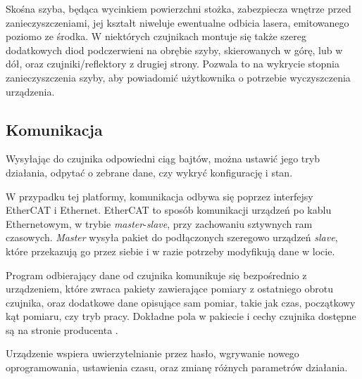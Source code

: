 		Skośna szyba, będąca wycinkiem powierzchni stożka, zabezpiecza wnętrze przed zanieczyszczeniami, jej kształt niweluje ewentualne odbicia lasera, emitowanego poziomo ze środka.
		W niektórych czujnikach montuje się także szereg dodatkowych diod podczerwieni na obrębie szyby, skierowanych w górę, lub w dół, oraz czujniki/reflektory z drugiej strony.
		Pozwala to na wykrycie stopnia zanieczyszczenia szyby, aby powiadomić użytkownika o potrzebie wyczyszczenia urządzenia.

	\subsection{Komunikacja}
		Wysyłając do czujnika odpowiedni ciąg bajtów, można ustawić jego tryb działania, odpytać o zebrane dane, czy wykryć konfigurację i stan.

		W przypadku tej platformy, komunikacja odbywa się poprzez interfejsy EtherCAT i Ethernet.
		EtherCAT to sposób komunikacji urządzeń po kablu Ethernetowym, w trybie \emph{master}-\emph{slave}, przy zachowaniu sztywnych ram czasowych. 
		\emph{Master} wysyła pakiet do podłączonych szeregowo urządzeń \emph{slave}, które przekazują go przez siebie i w razie potrzeby modyfikują dane w locie.
		
		Program odbierający dane od czujnika komunikuje się bezpośrednio z urządzeniem, które zwraca pakiety zawierające pomiary z ostatniego obrotu czujnika, oraz dodatkowe dane 
		opisujące sam pomiar, takie jak czas, początkowy kąt pomiaru, czy tryb pracy.
		Dokładne pola w pakiecie i cechy czujnika dostępne są na stronie producenta \cite{sick_website}.

		Urządzenie wspiera uwierzytelnianie przez hasło, wgrywanie nowego oprogramowania,
		ustawienia czasu, oraz zmianę różnych parametrów działania.

